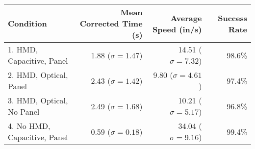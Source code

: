 \begin{tabular}{lrrr}
\toprule
Condition & Mean Corrected Time (s) & Average Speed (in/s) & Success Rate \\
\midrule
1. HMD, Capacitive, Panel    &  1.88 ($\sigma = 1.47$) & 14.51 ($\sigma = 7.32$) & 98.6\% \\
2. HMD, Optical, Panel       &  2.43 ($\sigma = 1.42$) & 9.80 ($\sigma = 4.61$) & 97.4\% \\
3. HMD, Optical, No Panel    &  2.49 ($\sigma = 1.68$) & 10.21 ($\sigma = 5.17$) & 96.8\% \\
4. No HMD, Capacitive, Panel &  0.59 ($\sigma = 0.18$) & 34.04 ($\sigma = 9.16$) & 99.4\% \\
\bottomrule
\end{tabular}
